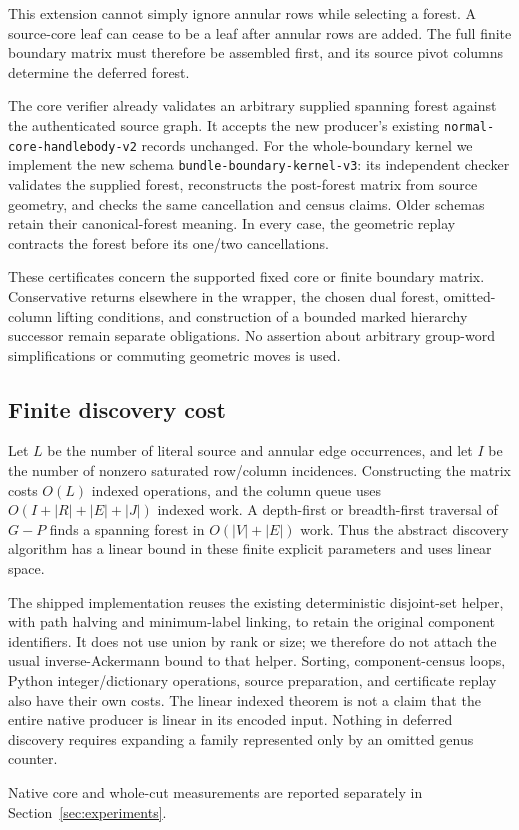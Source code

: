 This extension cannot simply ignore annular rows while selecting a
forest.  A source-core leaf can cease to be a leaf after annular rows are
added.  The full finite boundary matrix must therefore be assembled first,
and its source pivot columns determine the deferred forest.

The core verifier already validates an arbitrary supplied spanning forest
against the authenticated source graph.  It accepts the new producer's
existing \texttt{normal-core-handlebody-v2} records unchanged.  For the
whole-boundary kernel we implement the new schema
\texttt{bundle-boundary-kernel-v3}: its independent checker validates the
supplied forest, reconstructs the post-forest matrix from source geometry,
and checks the same cancellation and census claims.  Older schemas retain
their canonical-forest meaning.  In every case, the geometric replay
contracts the forest before its one/two cancellations.

These certificates concern the supported fixed core or finite boundary
matrix.  Conservative returns elsewhere in the wrapper, the chosen dual
forest, omitted-column lifting conditions, and construction of a bounded
marked hierarchy successor remain separate obligations.  No assertion
about arbitrary group-word simplifications or commuting geometric moves
is used.

\subsection{Finite discovery cost}

Let $L$ be the number of literal source and annular edge occurrences,
and let $I$ be the number of nonzero saturated row/column incidences.
Constructing the matrix costs $O(L)$ indexed operations, and the column
queue uses $O(I+|R|+|E|+|J|)$ indexed work.  A depth-first or breadth-first
traversal of $G-P$ finds a spanning forest in $O(|V|+|E|)$ work.  Thus the
abstract discovery algorithm has a linear bound in these finite explicit
parameters and uses linear space.

The shipped implementation reuses the existing deterministic disjoint-set
helper, with path halving and minimum-label linking, to retain the original
component identifiers.  It does not use union by rank or size; we therefore
do not attach the usual inverse-Ackermann bound to that helper.  Sorting,
component-census loops, Python integer/dictionary operations, source
preparation, and certificate replay also have their own costs.  The
linear indexed theorem is not a claim that the entire native producer is
linear in its encoded input.  Nothing in deferred discovery requires
expanding a family represented only by an omitted genus counter.

Native core and whole-cut measurements are reported separately in
Section~\ref{sec:experiments}.

